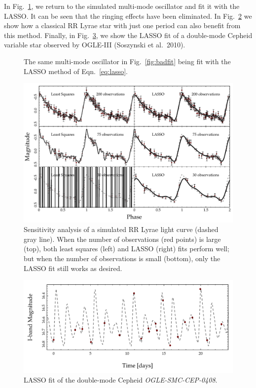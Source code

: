 \documentclass[11pt,twoside]{book}
\begin{document}
In Fig.~\ref{fig:goodfit}, we return to the simulated multi-mode oscillator and fit it with the LASSO. It can be seen that the ringing effects have been eliminated. In Fig.~\ref{fig:sensitivity} we show how a classical RR Lyrae star with just one period can also benefit from this method. Finally, in Fig.~\ref{fig:multimode}, we show the LASSO fit of a double-mode Cepheid variable star observed by OGLE-III (Soszynski et al.~2010). 

\begin{figure}
    \centering
    
    \caption{The same multi-mode oscillator in Fig.~\ref{fig:badfit} being fit with the LASSO method of Eqn.~\ref{eq:lasso}.} 
    \label{fig:goodfit} 
\end{figure}

\begin{figure}
    \centering
    \includegraphics[width=\textwidth,keepaspectratio]{sensitivity.pdf}
    \caption{Sensitivity analysis of a simulated RR Lyrae light curve (dashed gray line). When the number of observations (red points) is large (top), both least squares (left) and LASSO (right) fits perform well; but when the number of observations is small (bottom), only the LASSO fit still works as desired.} 
    \label{fig:sensitivity} 
\end{figure}

\begin{figure}
    \centering
    \includegraphics[width=\textwidth,keepaspectratio]{OGLE-SMC-CEP-0408.pdf}
    \caption{LASSO fit of the double-mode Cepheid \emph{OGLE-SMC-CEP-0408}.}
    \label{fig:multimode} 
\end{figure}
\end{document}
